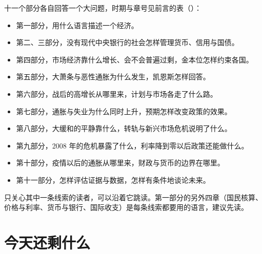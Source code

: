 十一个部分各自回答一个大问题，时期与章号见前言的表（）：
\begin{itemize}
\item 第一部分，用什么语言描述一个经济。
\item 第二、三部分，没有现代中央银行的社会怎样管理货币、信用与国债。
\item 第四部分，市场经济靠什么增长、会不会普遍过剩，金本位怎样约束各国。
\item 第五部分，大萧条与恶性通胀为什么发生，凯恩斯怎样回答。
\item 第六部分，战后的高增长从哪里来，计划与市场各走了什么路。
\item 第七部分，通胀与失业为什么同时上升，预期怎样改变政策的效果。
\item 第八部分，大缓和的平静靠什么，转轨与新兴市场危机说明了什么。
\item 第九部分，2008 年的危机暴露了什么，利率降到零以后政策还能做什么。
\item 第十部分，疫情以后的通胀从哪里来，财政与货币的边界在哪里。
\item 第十一部分，怎样评估证据与数据，怎样有条件地谈论未来。
\end{itemize}

只关心其中一条线索的读者，可以沿着它跳读。第一部分的另外四章（国民核算、价格与利率、货币与银行、国际收支）是每条线索都要用的语言，建议先读。


\section{今天还剩什么}\label{sec:intro-legacy}

